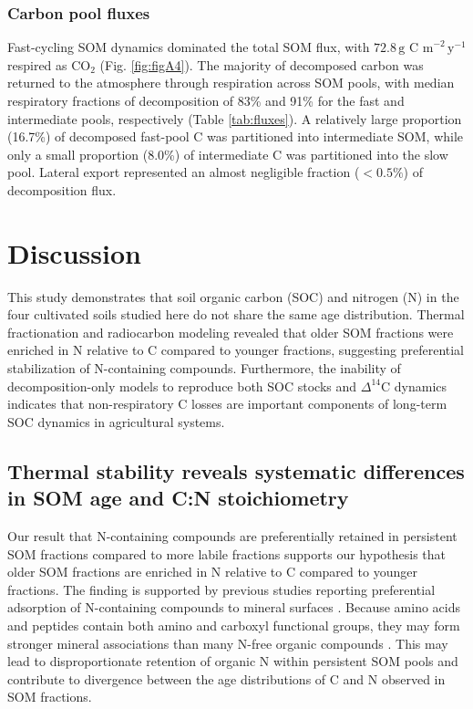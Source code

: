 \documentclass[bg, manuscript]{copernicus}
\begin{document}
\subsubsection{Carbon pool fluxes}
Fast-cycling SOM dynamics dominated the total SOM flux, with $72.8\,\text{g C m}^{-2}\,\text{y}^{-1}$ respired as $\text{CO}_2$ (Fig. \ref{fig:figA4}). The majority of decomposed carbon was returned to the atmosphere through respiration across SOM pools, with median respiratory fractions of decomposition of 83\% and 91\% for the fast and intermediate pools, respectively (Table \ref{tab:fluxes}). A relatively large proportion (16.7\%) of decomposed fast-pool C was partitioned into intermediate SOM, while only a small proportion (8.0\%) of intermediate C was partitioned into the slow pool. Lateral export represented an almost negligible fraction ($< 0.5\%$) of decomposition flux.

\section{Discussion}

This study demonstrates that soil organic carbon (SOC) and nitrogen (N) in the four cultivated soils studied here do not share the same age distribution. Thermal fractionation and radiocarbon modeling revealed that older SOM fractions were enriched in N relative to C compared to younger fractions, suggesting preferential stabilization of N-containing compounds. Furthermore, the inability of decomposition-only models to reproduce both SOC stocks and $\Delta^{14}\text{C}$ dynamics indicates that non-respiratory C losses are important components of long-term SOC dynamics in agricultural systems.

\subsection{Thermal stability reveals systematic differences in SOM age and C:N stoichiometry}
Our result that N-containing compounds are preferentially retained in persistent SOM fractions compared to more labile fractions supports our hypothesis that older SOM fractions are enriched in N relative to C compared to younger fractions. The finding is supported by previous studies reporting preferential adsorption of N-containing compounds to mineral surfaces \citep{Cao2011, Kopittke2018, Daly2021}. Because amino acids and peptides contain both amino and carboxyl functional groups, they may form stronger mineral associations than many N-free organic compounds \citep{Spohn2024}. This may lead to disproportionate retention of organic N within persistent SOM pools and contribute to divergence between the age distributions of C and N observed in SOM fractions.
\end{document}
